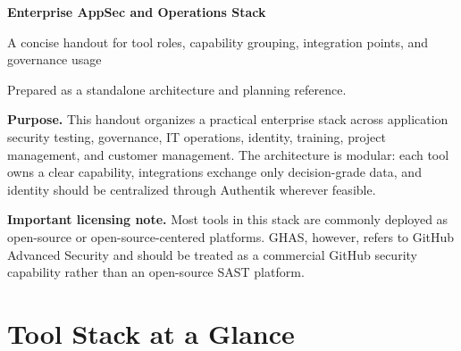 \documentclass[10pt,letterpaper]{article}
\begin{document}
{\Huge\bfseries\color{Navy} Enterprise AppSec and Operations Stack}\par
{\large\color{GrayText} A concise handout for tool roles, capability grouping, integration points, and governance usage}\par
\vspace{4pt}
{\small\color{GrayText} Prepared as a standalone architecture and planning reference.}\par
\vspace{10pt}

\begin{summarybox}
\textbf{Purpose.} This handout organizes a practical enterprise stack across application security testing, governance, IT operations, identity, training, project management, and customer management. The architecture is modular: each tool owns a clear capability, integrations exchange only decision-grade data, and identity should be centralized through Authentik wherever feasible.
\end{summarybox}

\begin{warningbox}
\textbf{Important licensing note.} Most tools in this stack are commonly deployed as open-source or open-source-centered platforms. GHAS, however, refers to GitHub Advanced Security and should be treated as a commercial GitHub security capability rather than an open-source SAST platform.
\end{warningbox}

\section{Tool Stack at a Glance}
\end{document}
